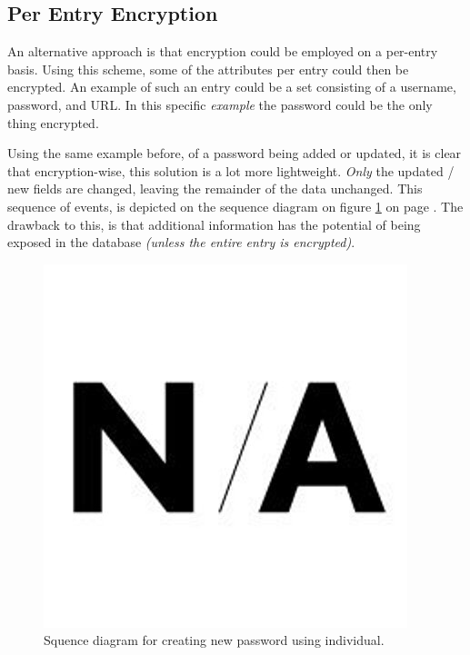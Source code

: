 		\subsection{Per Entry Encryption}
			An alternative approach is that encryption could be employed on a per-entry basis. Using this scheme, some of the attributes per entry could then be encrypted. An example of such an entry could be a set consisting of a username, password, and URL. In this specific \emph{example} the password could be the only thing encrypted. 

			Using the same example before, of a password being added or updated, it is clear that encryption-wise, this solution is a lot more lightweight. \emph{Only} the updated / new fields are changed, leaving the remainder of the data unchanged. This sequence of events, is depicted on the sequence diagram on figure \ref{fig:seq_perentry} on page \pageref{fig:seq_perentry}. The drawback to this, is that additional information has the potential of being exposed in the database \emph{(unless the entire entry is encrypted)}.


			\begin{figure}[h!]
				\centering
				\includegraphics[width=\textwidth]{figures/design/na.png}
				\caption{Squence diagram for creating new password using individual.}
				\label{fig:seq_perentry}
			\end{figure}

